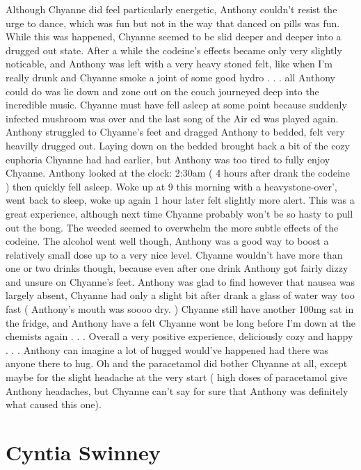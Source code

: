\documentclass[12pt]{book}
\begin{document}
Although Chyanne did feel particularly energetic, Anthony couldn't resist the urge to dance, which was fun but not in the way that danced on pills was fun. While this was happened, Chyanne seemed to be slid deeper and deeper into a drugged out state. After a while the codeine's effects became only very slightly noticable, and Anthony was left with a very heavy stoned felt, like when I'm really drunk and Chyanne smoke a joint of some good hydro . . .  all Anthony could do was lie down and zone out on the couch journeyed deep into the incredible music. Chyanne must have fell asleep at some point because suddenly infected mushroom was over and the last song of the Air cd was played again. Anthony struggled to Chyanne's feet and dragged Anthony to bedded, felt very heavilly drugged out. Laying down on the bedded brought back a bit of the cozy euphoria Chyanne had had earlier, but Anthony was too tired to fully enjoy Chyanne. Anthony looked at the clock: 2:30am ( 4 hours after drank the codeine ) then quickly fell asleep. Woke up at 9 this morning with a heavystone-over', went back to sleep, woke up again 1 hour later felt slightly more alert. This was a great experience, although next time Chyanne probably won't be so hasty to pull out the bong. The weeded seemed to overwhelm the more subtle effects of the codeine. The alcohol went well though, Anthony was a good way to boost a relatively small dose up to a very nice level. Chyanne wouldn't have more than one or two drinks though, because even after one drink Anthony got fairly dizzy and unsure on Chyanne's feet. Anthony was glad to find however that nausea was largely absent, Chyanne had only a slight bit after drank a glass of water way too fast ( Anthony's mouth was soooo dry. ) Chyanne still have another 100mg sat in the fridge, and Anthony have a felt Chyanne wont be long before I'm down at the chemists again . . .  Overall a very positive experience, deliciously cozy and happy . . .  Anthony can imagine a lot of hugged would've happened had there was anyone there to hug. Oh and the paracetamol did bother Chyanne at all, except maybe for the slight headache at the very start ( high doses of paracetamol give Anthony headaches, but Chyanne can't say for sure that Anthony was definitely what caused this one).



\chapter{Cyntia Swinney}
\end{document}
